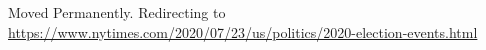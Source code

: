 Moved Permanently. Redirecting to
\url{https://www.nytimes.com/2020/07/23/us/politics/2020-election-events.html}
